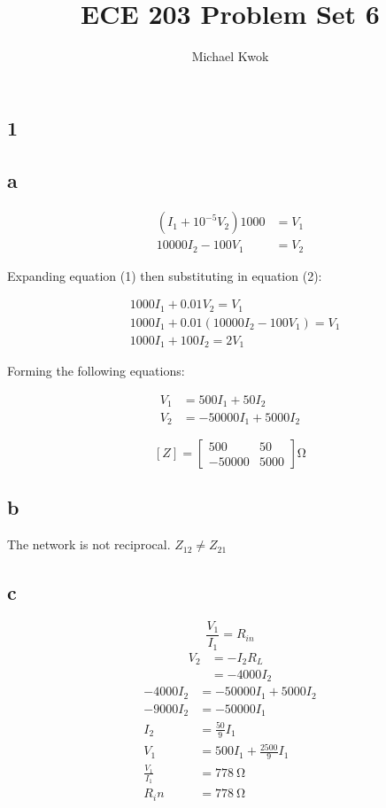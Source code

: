 \documentclass{article}
\title{ECE 203 Problem Set 6}
\author{Michael Kwok}
\begin{document}
\maketitle
\begin{multicols}{2}
\section*{1}
\subsection*{a}
\begin{align}
    \left(I_1 + 10^{-5} V_2\right) 1000 &= V_1\\
    10000 I_2 - 100 V_1 &= V_2
\end{align}

Expanding equation (1) then substituting in equation (2):

\begin{align*}
    &1000 I_1 + 0.01 V_2 = V_1\\
    &1000 I_1 + 0.01 \left(10000 I_2 - 100 V_1\right) = V_1\\
    &1000 I_1 + 100 I_2 = 2 V_1
\end{align*}

Forming the following equations:

\begin{align}
    V_1 &= 500 I_1 + 50 I_2\\
    V_2 &= -50000 I_1 + 5000 I_2
\end{align}

$$
  [Z] = 
  \begin{bmatrix}
  500 & 50\\
  -50000 & 5000
  \end{bmatrix}
  \si{\ohm}
$$
\subsection*{b}
The network is not reciprocal. $Z_{12} \neq Z_{21}$
\subsection*{c}
$$
\frac{V_1}{I_1} = R_{in}
$$
\begin{align*}
    V_2 &= -I_2 R_L\\
    &= -4000 I_2
\end{align*}
\begin{align*}
    -4000 I_2 &= -50000 I_1 + 5000 I_2\\
    -9000 I_2 &= -50000 I_1\\
    I_2 &= \frac{50}{9}I_1\\
    V_1 &= 500 I_1 + \frac{2500}{9} I_1\\
    \frac{V_1}{I_1} &= \SI{778}{\ohm}\\
    R_in &= \SI{778}{\ohm}
\end{align*}

\end{multicols}
\end{document}
